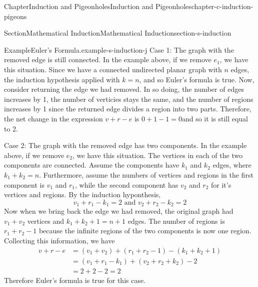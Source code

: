 \documentclass[oneside,10pt,]{book}
\numberwithin{equation}{section}
\begin{document}
\begin{chapterptx}{Chapter}{Induction and Pigeonholes}{}{Induction and Pigeonholes}{}{}{chapter-c-induction-pigeons}
\begin{sectionptx}{Section}{Mathematical Induction}{}{Mathematical Induction}{}{}{section-s-induction}
\begin{example}{Example}{Euler's Formula.}{example-s-induction-j}
Case 1:  The graph with the removed edge is still connected. In the example above, if we remove \(e_1\), we have this situation.  Since we have a connected undirected planar graph with \(n\) edges, the induction hypothesis applied with \(k=n\), and so Euler's formula is true.  Now, consider returning the edge we had removed.  In so doing, the number of edges increases by 1, the number of verticies stays the same, and the number of regions increases by 1 since the returned edge divides a region into two parts.  Therefore, the net change in the expression \(v+r-e\) is \(0+1-1=0\)and so it is still equal to 2.%
\par
Case 2: The graph with the removed edge has two components. In the example above, if we remove \(e_2\), we have this situation.   The vertices in each of the two components are connected.  Assume the components have \(k_1\) and \(k_2\) edges, where \(k_1+k_2= n\).  Furthermore, assume the numbers of vertices and regions in the first component is \(v_1\) and \(r_1\), while the second component has \(v_2\) and \(r_2\) for it\textbraceleft{}'\textbraceright{}s vertices and regions. By the induction hyponthesis,%
\begin{equation*}
v_1+r_1-k_1=2 \textrm{ and } v_2+r_2-k_2=2
\end{equation*}
Now when we bring back the edge we had removed, the original graph had \(v_1+ v_2\) vertices and \(k_1+k_2+1= n+1\) edges.  The number of regions is \(r_1+ r_2-1\) because the infinite regions of the two components  is now one region.  Collecting this information, we have%
\begin{equation*}
\begin{split}
v+r-e &= \left(v_1+v_2\right)+\left(r_1+ r_2-1\right) -\left(k_1+k_2+1\right)\\
& = \left(v_1+r_1-k_1\right)+ \left(v_2+r_2+k_2\right) -2\\
&=2+2-2 = 2
\end{split}
\end{equation*}
Therefore Euler's formula is true for this case.%
\end{example}
\end{sectionptx}
\end{chapterptx}
\end{document}
